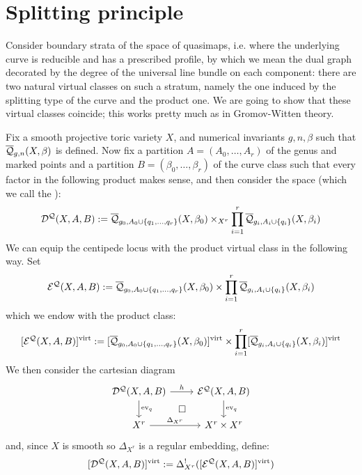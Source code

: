 \section{Splitting principle}

Consider boundary strata of the space of quasimaps, i.e. where the underlying curve is reducible and has a prescribed profile, by which we mean the dual graph decorated by the degree of the universal line bundle on each component: there are two natural virtual classes on such a stratum, namely the one induced by the splitting type of the curve and the product one. We are going to show that these virtual classes coincide; this works pretty much as in Gromov-Witten theory.

Fix a smooth projective toric variety $X$, and numerical invariants $g,n,\beta$ such that $\overline{\mathcal Q}_{g,n}(X,\beta)$ is defined. Now fix a partition $A=(A_0,\ldots,A_r)$ of the genus and marked points and a partition $B=(\beta_0, \ldots, \beta_r)$ of the curve class such that every factor in the following product makes sense, and then consider the space (which we call the ):
\begin{equation*} \mathcal{D^Q}(X,A,B) := \overline{\mathcal Q}_{g_0,A_0 \cup \{ q_1, \ldots, q_r \}}(X,\beta_0) \times_{X^r} \prod_{i=1}^r \overline{\mathcal Q}_{g_i,A_i\cup\{q_i\}}(X,\beta_i) \end{equation*}
We can equip the centipede locus with the product virtual class in the following way. Set
\begin{equation*} \mathcal{E^Q}(X,A,B) :=  \overline{\mathcal Q}_{g_0,A_0 \cup \{ q_1, \ldots, q_r \}}(X,\beta_0) \times \prod_{i=1}^r \overline{\mathcal Q}_{g_i,A_i\cup\{q_i\}}(X,\beta_i) \end{equation*}
which we endow with the product class:
\begin{equation*} [\mathcal{E^Q}(X,A,B)]^{\operatorname{virt}} := [\overline{\mathcal Q}_{g_0,A_0 \cup \{ q_1, \ldots, q_r \}}(X,\beta_0)]^{\operatorname{virt}} \times \prod_{i=1}^r [\overline{\mathcal Q}_{g_i,A_i\cup\{q_i\}}(X,\beta_i)]^{\operatorname{virt}} \end{equation*}
We then consider the cartesian diagram
\begin{equation} \label{Product diagram}
\begin{tikzcd}
\D{X}{A}{B} \ar[r,"h"] \ar[d,"\ev_q"] \ar[rd,phantom,"\square"] & \E{X}{A}{B} \ar[d,"\ev_q"] \\
X^r \ar[r,"\Delta_{X^r}"] & X^r \times X^r
\end{tikzcd}
\end{equation}
and, since $X$ is smooth so $\Delta_{X^r}$ is a regular embedding, define:
\begin{equation*} [\mathcal{D^Q}(X,A,B)]^{\operatorname{virt}} := \Delta_{X^r}^! ([\mathcal{E^Q}(X,A,B)]^{\operatorname{virt}}) \end{equation*}
